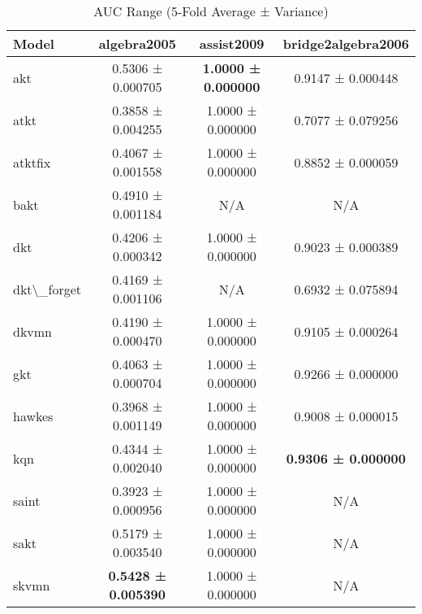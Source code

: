 \begin{table}[H]
\centering
\caption{AUC Range (5-Fold Average ± Variance)}
\label{tab:auc_range}
\begin{tabular}{lccc}
\toprule
Model & algebra2005 & assist2009 & bridge2algebra2006 \\
\midrule
akt & 0.5306 ± 0.000705 & \textbf{1.0000 ± 0.000000} & 0.9147 ± 0.000448 \\
atkt & 0.3858 ± 0.004255 & 1.0000 ± 0.000000 & 0.7077 ± 0.079256 \\
atktfix & 0.4067 ± 0.001558 & 1.0000 ± 0.000000 & 0.8852 ± 0.000059 \\
bakt & 0.4910 ± 0.001184 & N/A & N/A \\
dkt & 0.4206 ± 0.000342 & 1.0000 ± 0.000000 & 0.9023 ± 0.000389 \\
dkt\textbackslash{}_forget & 0.4169 ± 0.001106 & N/A & 0.6932 ± 0.075894 \\
dkvmn & 0.4190 ± 0.000470 & 1.0000 ± 0.000000 & 0.9105 ± 0.000264 \\
gkt & 0.4063 ± 0.000704 & 1.0000 ± 0.000000 & 0.9266 ± 0.000000 \\
hawkes & 0.3968 ± 0.001149 & 1.0000 ± 0.000000 & 0.9008 ± 0.000015 \\
kqn & 0.4344 ± 0.002040 & 1.0000 ± 0.000000 & \textbf{0.9306 ± 0.000000} \\
saint & 0.3923 ± 0.000956 & 1.0000 ± 0.000000 & N/A \\
sakt & 0.5179 ± 0.003540 & 1.0000 ± 0.000000 & N/A \\
skvmn & \textbf{0.5428 ± 0.005390} & 1.0000 ± 0.000000 & N/A \\
\bottomrule
\end{tabular}
\end{table}